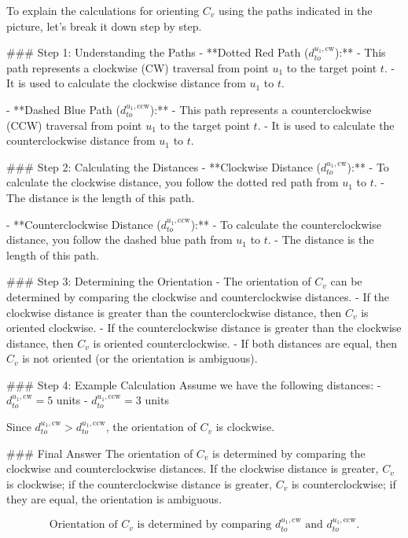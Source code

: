 To explain the calculations for orienting \( C_v \) using the paths indicated in the picture, let's break it down step by step.

### Step 1: Understanding the Paths
- **Dotted Red Path (\( d_{to}^{u_1,\text{cw}} \)):**
  - This path represents a clockwise (CW) traversal from point \( u_1 \) to the target point \( t \).
  - It is used to calculate the clockwise distance from \( u_1 \) to \( t \).

- **Dashed Blue Path (\( d_{to}^{u_1,\text{ccw}} \)):**
  - This path represents a counterclockwise (CCW) traversal from point \( u_1 \) to the target point \( t \).
  - It is used to calculate the counterclockwise distance from \( u_1 \) to \( t \).

### Step 2: Calculating the Distances
- **Clockwise Distance (\( d_{to}^{u_1,\text{cw}} \)):**
  - To calculate the clockwise distance, you follow the dotted red path from \( u_1 \) to \( t \).
  - The distance is the length of this path.

- **Counterclockwise Distance (\( d_{to}^{u_1,\text{ccw}} \)):**
  - To calculate the counterclockwise distance, you follow the dashed blue path from \( u_1 \) to \( t \).
  - The distance is the length of this path.

### Step 3: Determining the Orientation
- The orientation of \( C_v \) can be determined by comparing the clockwise and counterclockwise distances.
- If the clockwise distance is greater than the counterclockwise distance, then \( C_v \) is oriented clockwise.
- If the counterclockwise distance is greater than the clockwise distance, then \( C_v \) is oriented counterclockwise.
- If both distances are equal, then \( C_v \) is not oriented (or the orientation is ambiguous).

### Step 4: Example Calculation
Assume we have the following distances:
- \( d_{to}^{u_1,\text{cw}} = 5 \) units
- \( d_{to}^{u_1,\text{ccw}} = 3 \) units

Since \( d_{to}^{u_1,\text{cw}} > d_{to}^{u_1,\text{ccw}} \), the orientation of \( C_v \) is clockwise.

### Final Answer
The orientation of \( C_v \) is determined by comparing the clockwise and counterclockwise distances. If the clockwise distance is greater, \( C_v \) is clockwise; if the counterclockwise distance is greater, \( C_v \) is counterclockwise; if they are equal, the orientation is ambiguous.

\[
\boxed{\text{Orientation of } C_v \text{ is determined by comparing } d_{to}^{u_1,\text{cw}} \text{ and } d_{to}^{u_1,\text{ccw}}.}
\]